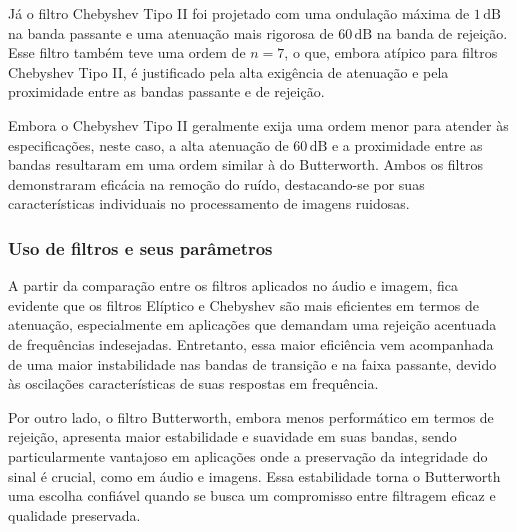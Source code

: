 Já o filtro Chebyshev Tipo II foi projetado com uma ondulação máxima de $1 \, \text{dB}$ na banda passante e uma atenuação mais rigorosa de $60 \, \text{dB}$ na banda de rejeição. Esse filtro também teve uma ordem de $n = 7$, o que, embora atípico para filtros Chebyshev Tipo II, é justificado pela alta exigência de atenuação e pela proximidade entre as bandas passante e de rejeição.

Embora o Chebyshev Tipo II geralmente exija uma ordem menor para atender às especificações, neste caso, a alta atenuação de $60 \, \text{dB}$ e a proximidade entre as bandas resultaram em uma ordem similar à do Butterworth. Ambos os filtros demonstraram eficácia na remoção do ruído, destacando-se por suas características individuais no processamento de imagens ruidosas.

\subsubsection*{Uso de filtros e seus parâmetros}

A partir da comparação entre os filtros aplicados no áudio e imagem, fica evidente que os filtros Elíptico e Chebyshev são mais eficientes em termos de atenuação, especialmente em aplicações que demandam uma rejeição acentuada de frequências indesejadas. Entretanto, essa maior eficiência vem acompanhada de uma maior instabilidade nas bandas de transição e na faixa passante, devido às oscilações características de suas respostas em frequência.

Por outro lado, o filtro Butterworth, embora menos performático em termos de rejeição, apresenta maior estabilidade e suavidade em suas bandas, sendo particularmente vantajoso em aplicações onde a preservação da integridade do sinal é crucial, como em áudio e imagens. Essa estabilidade torna o Butterworth uma escolha confiável quando se busca um compromisso entre filtragem eficaz e qualidade preservada.
